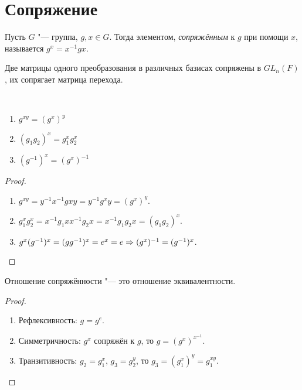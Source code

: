 \documentclass[main]{subfiles}
\begin{document}

\section{Сопряжение}
\begin{definition}
  Пусть $G$ "--- группа, $g, x \in G$.
  Тогда элементом, \emph{сопряжённым} к $g$ при
  помощи $x$,
  называется $g^x = x^{-1} g x$.
\end{definition}
\begin{example}
  Две матрицы одного преобразования
  в различных базисах
  сопряжены в $GL_n(F)$,
  их сопрягает матрица перехода.
\end{example}

\begin{proposition}~
  \begin{enumerate}
    \item $g^{xy} = (g^x)^y$
    \item $(g_1 g_2)^x = g_1^x g_2^x$
    \item $(g^{-1})^x = (g^x)^{-1}$
  \end{enumerate}
\end{proposition}
\begin{proof}~
  \begin{enumerate}
    \item $g^{xy} = y^{-1} x^{-1} g x y = y^{-1} g^x y = (g^x)^y$.
    \item $g_1^x g_2^x = x^{-1} g_1 x x^{-1} g_2 x =
      x^{-1} g_1 g_2 x = (g_1 g_2)^x$.
    \item $g^x (g^{-1})^x = (gg^{-1})^x = e^x = e \Rightarrow (g^x)^{-1} = (g^{-1})^x$.
  \end{enumerate}
\end{proof}

\begin{proposition}
  Отношение сопряжённости "--- это отношение эквивалентности.
\end{proposition}
\begin{proof}~
  \begin{enumerate}
  \item Рефлексивность: $g = g^e$.
  \item Симметричность: $g^x$ сопряжён к $g$, то $g = (g^x)^{x^{-1}}$.
  \item Транзитивность: $g_2 = g_1^x$, $g_3 = g_2^y$, то $g_3 = (g_1^x)^y =
    g_1^{xy}$. \qedhere
  \end{enumerate}
\end{proof}
\end{document}
